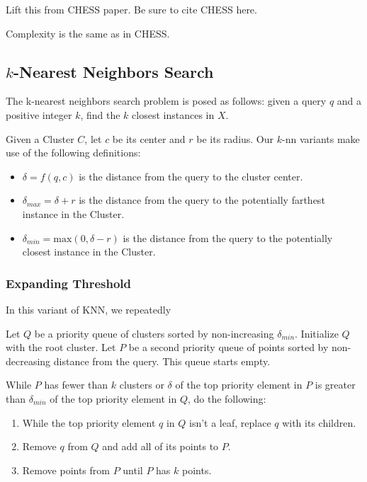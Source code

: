 Lift this from CHESS paper. Be sure to cite CHESS here.

Complexity is the same as in CHESS.

\subsection{\texorpdfstring{$k$}{k}-Nearest Neighbors Search}
\label{subsec:methods:knn-search}

The k-nearest neighbors search problem is posed as follows: given a query $q$ and a positive integer $k$, find the $k$ closest instances in $X$.

Given a Cluster $C$, let $c$ be its center and $r$ be its radius. Our $k$-nn variants make use of the following definitions:
\begin{itemize}
    \item $\delta = f(q, c)$ is the distance from the query to the cluster center.
    \item $\delta_{max} = \delta + r$ is the distance from the query to the potentially farthest instance in the Cluster.
    \item $\delta_{min} = \text{max}(0, \delta - r)$ is the distance from the query to the potentially closest instance in the Cluster.
\end{itemize}

\subsubsection{Expanding Threshold}
\label{subsubsec:methods:knn-search:expanding-threshold}
In this variant of KNN, we repeatedly  

Let $Q$ be a priority queue of clusters sorted by non-increasing $\delta_{min}$. Initialize $Q$ with the root cluster.
Let $P$ be a second priority queue of points sorted by non-decreasing distance from the query. This queue starts empty.

While $P$ has fewer than $k$ clusters or $\delta$ of the top priority element in $P$ is greater 
than $\delta_{min}$ of the top priority element in $Q$, do the following:
\begin{enumerate}
\item While the top priority element $q$ in $Q$ isn't a leaf, replace $q$ with its children.
\item Remove $q$ from $Q$ and add all of its points to $P$. 
\item Remove points from $P$ until $P$ has $k$ points. 
\end{enumerate}

